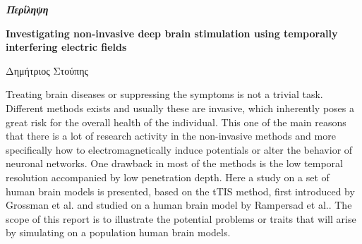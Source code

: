 \thispagestyle{plain}
\vspace*{\fill}
\begin{center}
    \LARGE
    \textit{\textbf{Περίληψη}}
        
    \vspace{0.4cm}
    \large
    \textbf{Investigating non-invasive deep brain stimulation using temporally interfering electric fields}
        
    \vspace{0.4cm}
    Δημήτριος Στούπης
\end{center}
\normalsize

\vspace{0.9cm}
Treating brain diseases or suppressing the symptoms is not a trivial task. Different methods exists and usually these are invasive, which inherently poses a great risk for the overall health of the individual. This one of the main reasons that there is a lot of research activity in the non-invasive methods and more specifically how to electromagnetically induce potentials or alter the behavior of neuronal networks. One drawback in most of the methods is the low temporal resolution accompanied by low penetration depth. Here a study on a set of human brain models\cite{ErikG.Lee2016} is presented, based on the \gls{tTIS} method, first introduced by Grossman et al.\cite{Grossman2017} and studied on a human brain model by Rampersad et al.\cite{Rampersad2019}. The scope of this report is to illustrate the potential problems or traits that will arise by simulating on a population human brain models. 
\vspace*{\fill}
